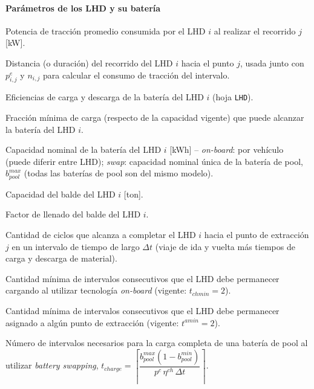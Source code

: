 \paragraph{Parámetros de los LHD y su batería}
\begin{description}[leftmargin=3cm, style=nextline]
    \item[$p_{i,j}^{e}$] Potencia de tracción promedio consumida por el LHD $i$ al realizar el recorrido $j$ [kW].
    \item[$d_{i,j}$] Distancia (o duración) del recorrido del LHD $i$ hacia el punto $j$, usada junto con $p^e_{i,j}$ y $n_{i,j}$ para calcular el consumo de tracción del intervalo.
    \item[$\eta^{ch}_i,\eta^{dis}_i$] Eficiencias de carga y descarga de la batería del LHD $i$ (hoja \texttt{LHD}).
    \item[$b^{min}_i$] Fracción mínima de carga (respecto de la capacidad vigente) que puede alcanzar la batería del LHD $i$.
    \item[$b^{max}_i$] Capacidad nominal de la batería del LHD $i$ [kWh] -- \textit{on-board}: por vehículo (puede diferir entre LHD); \textit{swap}: capacidad nominal única de la batería de pool, $b^{max}_{pool}$ (todas las baterías de pool son del mismo modelo).
    \item[$g_i$] Capacidad del balde del LHD $i$ [ton].
    \item[$\beta_{i}$] Factor de llenado del balde del LHD $i$.
    \item[$n_{i,j}$] Cantidad de ciclos que alcanza a completar el LHD $i$ hacia el punto de extracción $j$ en un intervalo de tiempo de largo $\Delta t$ (viaje de ida y vuelta más tiempos de carga y descarga de material).
    \item[$t_{chmin}$] Cantidad mínima de intervalos consecutivos que el LHD debe permanecer cargando al utilizar tecnología \textit{on-board} (vigente: $t_{chmin}=2$).
    \item [$t^{amin}$] Cantidad mínima de intervalos consecutivos que el LHD debe permanecer asignado a algún punto de extracción (vigente: $t^{amin}=2$).
    \item[$t_{charge}$] Número de intervalos necesarios para la carga completa de una batería de pool al utilizar \textit{battery swapping}, $t_{charge} = \left\lceil\dfrac{b^{max}_{pool}(1-b^{min}_{pool})}{p^c\,\eta^{ch}\,\Delta t}\right\rceil$.
    \item [$\gamma_m$] 

\end{description}
